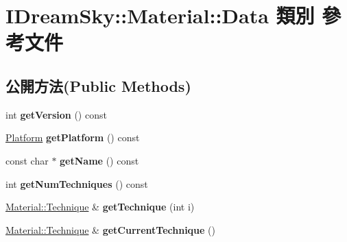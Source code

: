 \hypertarget{class_i_dream_sky_1_1_material_1_1_data}{}\section{I\+Dream\+Sky\+:\+:Material\+:\+:Data 類別 參考文件}
\label{class_i_dream_sky_1_1_material_1_1_data}
\subsection*{公開方法(Public Methods)}
\begin{DoxyCompactItemize}
\item 
int {\bfseries get\+Version} () const \hypertarget{class_i_dream_sky_1_1_material_1_1_data_a69e586e24a36a5713f58f7cbbed63545}{}\label{class_i_dream_sky_1_1_material_1_1_data_a69e586e24a36a5713f58f7cbbed63545}

\item 
\hyperlink{class_i_dream_sky_1_1_platform}{Platform} {\bfseries get\+Platform} () const \hypertarget{class_i_dream_sky_1_1_material_1_1_data_a9dd2e5be2b684cb55fb6de9f0cf69222}{}\label{class_i_dream_sky_1_1_material_1_1_data_a9dd2e5be2b684cb55fb6de9f0cf69222}

\item 
const char $\ast$ {\bfseries get\+Name} () const \hypertarget{class_i_dream_sky_1_1_material_1_1_data_a388c493795ae2f8a395cb03530fe479c}{}\label{class_i_dream_sky_1_1_material_1_1_data_a388c493795ae2f8a395cb03530fe479c}

\item 
int {\bfseries get\+Num\+Techniques} () const \hypertarget{class_i_dream_sky_1_1_material_1_1_data_a6606634f4dea3ced15d06bc73dbb8024}{}\label{class_i_dream_sky_1_1_material_1_1_data_a6606634f4dea3ced15d06bc73dbb8024}

\item 
\hyperlink{class_i_dream_sky_1_1_material_1_1_technique}{Material\+::\+Technique} \& {\bfseries get\+Technique} (int i)\hypertarget{class_i_dream_sky_1_1_material_1_1_data_a9aedbec51b975f97e8e74b42bd9039b6}{}\label{class_i_dream_sky_1_1_material_1_1_data_a9aedbec51b975f97e8e74b42bd9039b6}

\item 
\hyperlink{class_i_dream_sky_1_1_material_1_1_technique}{Material\+::\+Technique} \& {\bfseries get\+Current\+Technique} ()\hypertarget{class_i_dream_sky_1_1_material_1_1_data_a9b59dee475b5f0e2180201195e951112}{}\label{class_i_dream_sky_1_1_material_1_1_data_a9b59dee475b5f0e2180201195e951112}


\end{DoxyCompactItemize}
